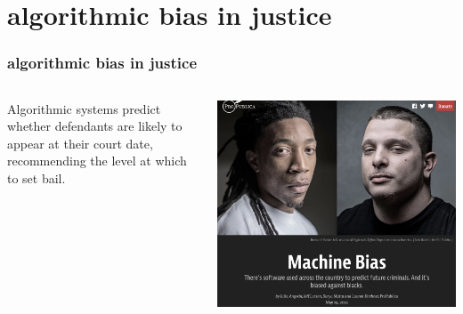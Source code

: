 \documentclass[presentation]{subfiles}
\begin{document}
\section{algorithmic bias in justice}

\begin{frame}\frametitle{algorithmic bias in justice}

\begin{columns}
\begin{column}{0.6\textwidth}

Algorithmic systems predict whether defendants are likely to appear at their court date, recommending the level at which to set bail.


\end{column}

\begin{column}{0.4\textwidth}
\includegraphics[width=\textwidth]{figures/propublica.png}
\end{column}
\end{columns}

\end{frame}
\end{document}
